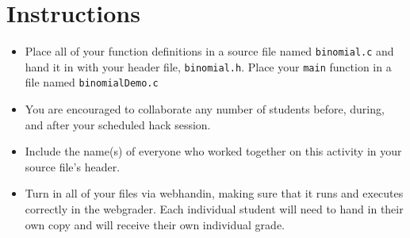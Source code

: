 \documentclass[12pt]{scrartcl}
\begin{document}
\section*{Instructions}

\begin{itemize}

  \item Place all of your function definitions in a source file named 
  \texttt{binomial.c} and hand it in with your header file, 
  \texttt{binomial.h}.  Place your \texttt{main} 
  function in a file named \texttt{binomialDemo.c} 

  \item You are encouraged to collaborate any number of students 
  before, during, and after your scheduled hack session.  

  \item Include the name(s) of everyone who worked together on
  this activity in your source file's header.

  \item Turn in all of your files via webhandin, making sure that 
  it runs and executes correctly in the webgrader.  Each individual 
  student will need to hand in their own copy and will receive 
  their own individual grade.
\end{itemize}  
\end{document}
